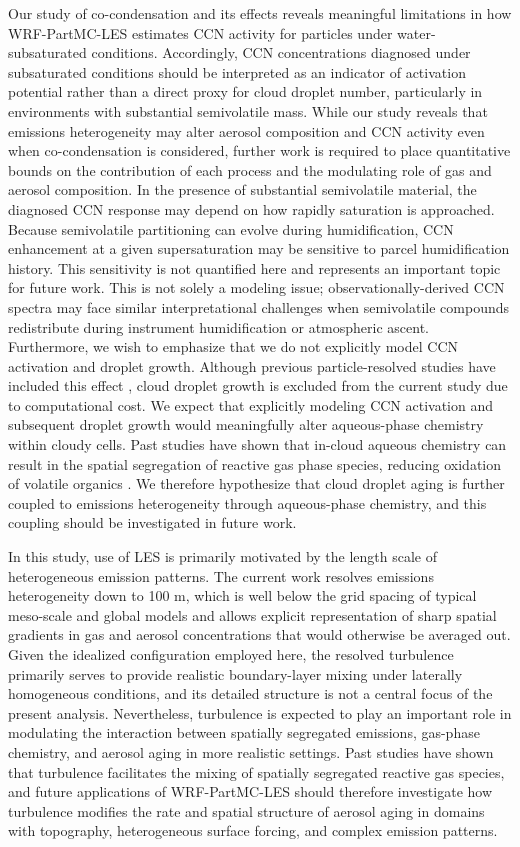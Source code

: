 \documentclass[acp]{copernicus}
\begin{document}
Our study of co-condensation and its effects reveals meaningful limitations in how WRF-PartMC-LES estimates CCN activity for particles under water-subsaturated conditions. Accordingly, CCN concentrations diagnosed under subsaturated conditions should be interpreted as an indicator of activation potential rather than a direct proxy for cloud droplet number, particularly in environments with substantial semivolatile mass. While our study reveals that emissions heterogeneity may alter aerosol composition and CCN activity even when co-condensation is considered, further work is required to place quantitative bounds on the contribution of each process and the modulating role of gas and aerosol composition. In the presence of substantial semivolatile material, the diagnosed CCN response may depend on how rapidly saturation is approached. Because semivolatile partitioning can evolve during humidification, CCN enhancement at a given supersaturation may be sensitive to parcel humidification history. This sensitivity is not quantified here and represents an important topic for future work. This is not solely a modeling issue; observationally-derived CCN spectra may face similar interpretational challenges when semivolatile compounds redistribute during instrument humidification or atmospheric ascent. Furthermore, we wish to emphasize that we do not explicitly model CCN activation and droplet growth. Although previous particle-resolved studies have included this effect \citep{ching_impacts_2012}, cloud droplet growth is excluded from the current study due to computational cost. We expect that explicitly modeling CCN activation and subsequent droplet growth would meaningfully alter aqueous-phase chemistry within cloudy cells. Past studies have shown that in-cloud aqueous chemistry can result in the spatial segregation of reactive gas phase species, reducing oxidation of volatile organics \citep{li_impact_2017}. We therefore hypothesize that cloud droplet aging is further coupled to emissions heterogeneity through aqueous-phase chemistry, and this coupling should be investigated in future work.

In this study, use of LES is primarily motivated by the length scale
of heterogeneous emission patterns. The current work resolves
emissions heterogeneity down to 100 m, which is well below the grid
spacing of typical meso-scale and global models and allows explicit
representation of sharp spatial gradients in gas and aerosol
concentrations that would otherwise be averaged out. Given the
idealized configuration employed here, the resolved turbulence
primarily serves to provide realistic boundary-layer mixing under
laterally homogeneous conditions, and its detailed structure is not a
central focus of the present analysis. Nevertheless, turbulence is
expected to play an important role in modulating the interaction
between spatially segregated emissions, gas-phase chemistry, and
aerosol aging in more realistic settings. Past studies have shown that
turbulence facilitates the mixing of spatially segregated reactive gas
species, and future applications of WRF-PartMC-LES should therefore
investigate how turbulence modifies the rate and spatial structure of
aerosol aging in domains with topography, heterogeneous surface
forcing, and complex emission patterns.
\end{document}
